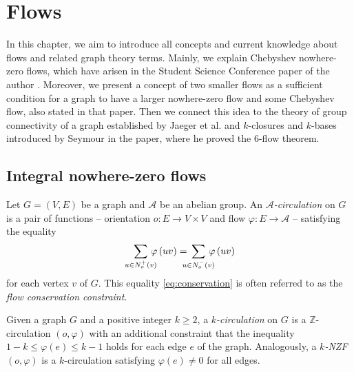 \chapter{Flows} %

In this chapter, we aim to introduce all concepts and current knowledge about flows and related graph theory terms. Mainly, we explain Chebyshev nowhere-zero flows, which
have arisen in the Student Science Conference paper of the author \cite{svk}. Moreover, we present a concept of two smaller flows as a sufficient condition for a graph to have
a larger nowhere-zero flow and some Chebyshev flow, also stated in that paper. Then we connect this idea to the theory of group connectivity of a graph established by Jaeger
et al. \cite{group_connectivity} and $k$-closures and $k$-bases introduced by Seymour \cite{seymour} in the paper, where he proved the $6$-flow theorem.


\section{Integral nowhere-zero flows}

\begin{definition}
    Let $G=(V, E)$ be a graph and $\mathcal A$ be an abelian group. An \emph{$\mathcal A$-circulation} on $G$ is a pair of functions -- orientation $o\colon E\to V\times V$ and flow $\varphi\colon E\to\mathcal A$ -- satisfying the equality
		\begin{equation}
			\sum_{u\in N^+_o(v)} \mkern-14mu\varphi\left(uv\right) =
			\mkern-14mu\sum_{u \in N^-_o(v)}\mkern-14mu\varphi\left(uv\right) \label{eq:conservation}
		\end{equation}
    for each vertex $v$ of $G$.	This equality \eqref{eq:conservation} is often referred to as the \textit{flow conservation constraint}.
\end{definition}
\begin{definition}
    Given a graph $G$ and a positive integer $k\geq2$, a \emph{$k$-circulation} on $G$ is a $\mathbb Z$-circulation $(o,\varphi)$ with an additional constraint that the inequality $1-k\leq\varphi(e)\leq k-1$ holds for each edge $e$ of the graph. Analogously, a \emph{$k$-NZF} $(o,\varphi)$ is a $k$-circulation satisfying $\varphi(e)\neq0$ for all edges.
\end{definition}

